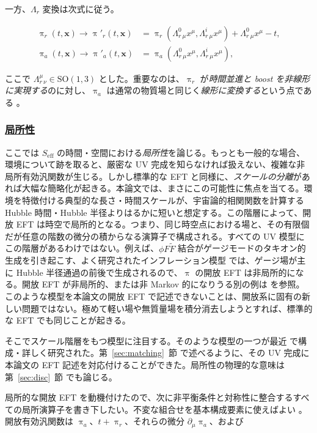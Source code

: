 \documentclass[a4paper,11pt]{ltjsarticle}
\numberwithin{equation}{section}
\newcommand{\subsubsectionlink}[1]{\subsubsection[#1]{\hyperlink{toc}{#1}}}
\newcommand{\boldmathsymbol}[1]{{\ensuremath{\boldsymbol{#1}}}}
\newcommand{\bmx}{\boldmathsymbol{x}}
\newcommand{\Sec}[1]{Sec.~\ref{#1}}
\def\bmx{{\boldsymbol{x}}}
\renewcommand{\Sec}[1]{第~\ref{#1}~節}
\begin{document}
一方、$\Lambda_r$ 変換は次式に従う。

\begin{align}\label{eq:LorentzRsym}
\uppi_{r}(t,\bmx) \rightarrow \uppi'_{r}(t,\bmx) &= \uppi_{r}\left(\Lambda^0_{r~\mu}x^\mu,\Lambda^i_{r~\mu}x^\mu \right)+\Lambda^0_{r~\mu}x^\mu - t, \\
\uppi_{a}(t,\bmx) \rightarrow \uppi'_{a}(t,\bmx) &= \uppi_{a}\left(\Lambda^0_{r~\mu}x^\mu,\Lambda^i_{r~\mu}x^\mu \right),
\end{align}

ここで $\Lambda^\mu_{r~\nu}\in\mathrm{SO}(1,3)$ とした。重要なのは、$\uppi_r$ が\textit{時間並進と boost を非線形に実現する}のに対し、$\uppi_a$ は通常の物質場と同じく\textit{線形に変換する}という点である \cite{Hongo:2018ant}。

\subsubsectionlink{局所性}

ここでは $S_{\mathrm{eff}}$ の時間・空間における\textit{局所性}を論じる。もっとも一般的な場合、環境について跡を取ると、厳密な UV 完成を知らなければ扱えない、複雑な非局所有効汎関数が生じる。しかし標準的な EFT と同様に、\textit{スケールの分離}があれば大幅な簡略化が起きる。本論文では、まさにこの可能性に焦点を当てる。環境を特徴付ける典型的な長さ・時間スケールが、宇宙論的相関関数を計算する Hubble 時間・Hubble 半径よりはるかに短いと想定する。この階層によって、開放 EFT は時空で局所的となる。つまり、同じ時空点における場と、その有限個だが任意の階数の微分の積からなる演算子で構成される。すべての UV 模型にこの階層があるわけではない。例えば、$\phi F\tilde F$ 結合がゲージモードのタキオン的生成を引き起こす、よく研究されたインフレーション模型 \cite{Anber:2009ua} では、ゲージ場が主に Hubble 半径通過の前後で生成されるので、$\uppi$ の開放 EFT は非局所的になる。開放 EFT が非局所的、または非 Markov 的になりうる別の例は \cite{breuerColloquiumNonMarkovianDynamics2016,Prudhoe:2022pte,Shandera:2017qkg,Colas:2022hlq,Colas:2022kfu,Colas:2024xjy} を参照。このような模型を本論文の開放 EFT で記述できないことは、開放系に固有の新しい問題ではない。極めて軽い場や無質量場を積分消去しようとすれば、標準的な EFT でも同じことが起きる。

そこでスケール階層をもつ模型に注目する。そのような模型の一つが最近 \cite{Creminelli:2023aly} で構成・詳しく研究された。\Sec{sec:matching} で述べるように、その UV 完成に本論文の EFT 記述を対応付けることができた。局所性の物理的な意味は \Sec{sec:disc} でも論じる。

局所的な開放 EFT を動機付けたので、次に非平衡条件と対称性に整合するすべての局所演算子を書き下したい。不変な組合せを基本構成要素に使えばよい \cite{Akyuz:2023lsm}。開放有効汎関数は $\uppi_a$、$t+\uppi_r$、それらの微分 $\partial_\mu\uppi_a$、および
\end{document}
